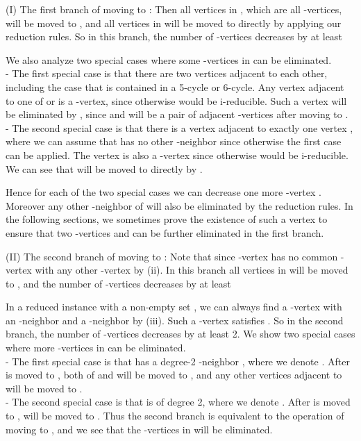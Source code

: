 \documentclass{elsart_TR2}
\begin{document}
(I) The first branch of moving    to :
Then all vertices in , which are all -vertices,
 will be moved to , and all vertices in  will be moved to  directly by applying our reduction rules.
So in this branch, the number of -vertices decreases by at least

We also analyze two special cases where  some  -vertices in  can be eliminated. \\
\noindent
- The first special case is that there are two vertices  adjacent to each other,
 including the case that  is contained in a 5-cycle or 6-cycle.
Any vertex  adjacent to one of  or  is
 a -vertex, since otherwise  would be i-reducible.
Such a vertex  will be eliminated by , since  and  will be a pair of adjacent -vertices after moving  to .
\\
\noindent - The second special case is that there is a vertex  adjacent to exactly
one vertex , where we can assume that  has no  other  -neighbor
 since otherwise  the first case can be applied.
The vertex  is also a -vertex since otherwise  would be i-reducible.
We can see that  will be moved to  directly by .

Hence for each of the two special cases we can decrease one more -vertex .
Moreover any other -neighbor  of  will also be eliminated by the reduction rules.
In the following sections,  we  sometimes prove the existence of such a vertex 
to ensure that two -vertices  and  can be further eliminated in the first branch.

(II) The second branch of moving    to :
Note that  since -vertex  has no common -vertex with any other -vertex by (ii).
In this branch all vertices in  will be moved to , and the number of -vertices decreases by at least

In a reduced instance with a non-empty set , we can always find
a -vertex  with  an -neighbor  and a -neighbor  by (iii).
Such a -vertex  satisfies
.
So in the second branch, the number of -vertices decreases by at least 2.
We show two special cases where  more -vertices in  can be eliminated.\\
\noindent -
The first special case is that  has a degree-2 -neighbor , where  we denote .
After  is moved to , both of  and  will be moved to , and any other vertices adjacent to  will be moved to . \\
\noindent - The second special case is that  is of degree 2, where  we denote .
 After  is moved to ,  will be moved to .
Thus the second branch is equivalent to the operation of moving  to ,
and we see that  the -vertices in  will be eliminated.
\end{document}
